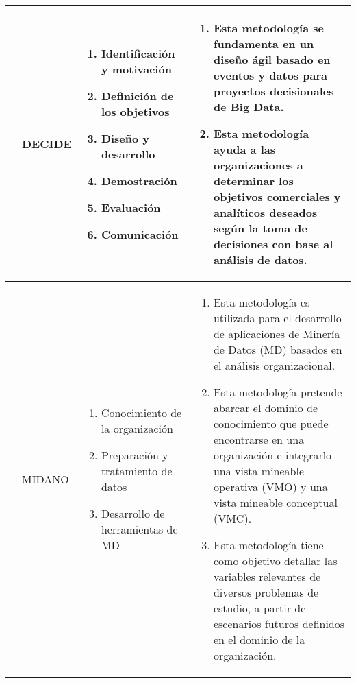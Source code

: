 \begin{table*}
\begin{threeparttable}
\begin{tabular}{ p{2cm} p{4cm} p{5cm} p{6cm}  }
			\citep{Sfaxi2020}
			&DECIDE
			&  \begin{enumerate}
				\item Identificación y motivación
				\item Definición de los objetivos
				\item Diseño y desarrollo
				\item Demostración
				\item Evaluación
				\item Comunicación
			\end{enumerate}
			& \begin{enumerate}
				\item Esta metodología se fundamenta en un diseño ágil basado en eventos y datos para proyectos decisionales de Big Data. 
				\item Esta metodología ayuda a las organizaciones a determinar los objetivos comerciales y analíticos deseados según la toma de decisiones con base al análisis de datos.
			\end{enumerate}
			\\ \hline
			\citep{Pacheco2014}
			&MIDANO
			&  \begin{enumerate}
				\item Conocimiento de la organización
				\item Preparación y tratamiento de datos
				\item Desarrollo de herramientas de MD
			\end{enumerate}
			& \begin{enumerate}
				\item Esta metodología es utilizada para el desarrollo de aplicaciones de Minería de Datos (MD) basados en el análisis organizacional.
				\item Esta metodología pretende abarcar el dominio de conocimiento que puede encontrarse en una organización e integrarlo una vista mineable operativa (VMO) y una vista mineable conceptual (VMC).
				\item Esta metodología tiene como objetivo detallar las variables relevantes de diversos problemas de estudio, a partir de escenarios futuros definidos en el dominio de la organización.
			\end{enumerate}
			\\ \hline
			

\end{tabular}
\end{threeparttable}
\end{table*}
